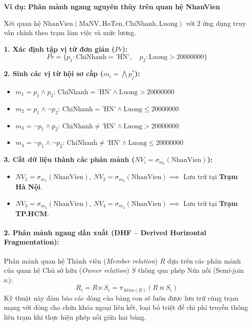 \documentclass[12pt,a4paper]{report}
\newenvironment{viduBox}[1]{%
    \par\vspace{6pt}\noindent
    \begin{minipage}{\textwidth}
    \begin{mdframed}[style=viduStyle]%
    \noindent\textbf{\color{myblue}Ví dụ: #1}\par\vspace{4pt}\small
}{%
    \end{mdframed}%
    \end{minipage}\par\vspace{6pt}
}
\begin{document}
\begin{viduBox}{Phân mảnh ngang nguyên thủy trên quan hệ NhanVien}
Xét quan hệ $\text{NhanVien}(\text{MaNV}, \text{HoTen}, \text{ChiNhanh}, \text{Luong})$ với 2 ứng dụng truy vấn chính theo trạm làm việc và mức lương.

\textbf{1. Xác định tập vị từ đơn giản ($Pr$):}
\[
Pr = \{p_1: \text{ChiNhanh} = \text{'HN'}, \quad p_2: \text{Luong} > 20000000\}
\]

\textbf{2. Sinh các vị từ hội sơ cấp ($m_i = \bigwedge p_j^*$):}
\begin{itemize}[leftmargin=0.6cm, topsep=1pt, itemsep=1pt]
    \item $m_1 = p_1 \wedge p_2$: $\text{ChiNhanh} = \text{'HN'} \wedge \text{Luong} > 20000000$
    \item $m_2 = p_1 \wedge \neg p_2$: $\text{ChiNhanh} = \text{'HN'} \wedge \text{Luong} \le 20000000$
    \item $m_3 = \neg p_1 \wedge p_2$: $\text{ChiNhanh} \neq \text{'HN'} \wedge \text{Luong} > 20000000$
    \item $m_4 = \neg p_1 \wedge \neg p_2$: $\text{ChiNhanh} \neq \text{'HN'} \wedge \text{Luong} \le 20000000$
\end{itemize}

\textbf{3. Cắt dữ liệu thành các phân mảnh ($NV_i = \sigma_{m_i}(\text{NhanVien})$):}
\begin{itemize}[leftmargin=0.6cm, topsep=1pt, itemsep=1pt]
    \item $NV_1 = \sigma_{m_1}(\text{NhanVien})$, $NV_2 = \sigma_{m_2}(\text{NhanVien}) \implies$ Lưu trữ tại \textbf{Trạm Hà Nội}.
    \item $NV_3 = \sigma_{m_3}(\text{NhanVien})$, $NV_4 = \sigma_{m_4}(\text{NhanVien}) \implies$ Lưu trữ tại \textbf{Trạm TP.HCM}.
\end{itemize}
\end{viduBox}

\paragraph{2. Phân mảnh ngang dẫn xuất (DHF -- Derived Horizontal Fragmentation):}
Phân mảnh quan hệ Thành viên (\textit{Member relation}) $R$ dựa trên các phân mảnh của quan hệ Chủ sở hữu (\textit{Owner relation}) $S$ thông qua phép Nửa nối (Semi-join $\ltimes$):
\[
    R_i = R \ltimes S_i = \pi_{\text{Attrs}(R)} (R \bowtie S_i)
\]
Kỹ thuật này đảm bảo các dòng của bảng con sẽ luôn được lưu trữ cùng trạm mạng với dòng cha chứa khóa ngoại liên kết, loại bỏ triệt để chi phí truyền thông liên trạm khi thực hiện phép nối giữa hai bảng.
\end{document}
